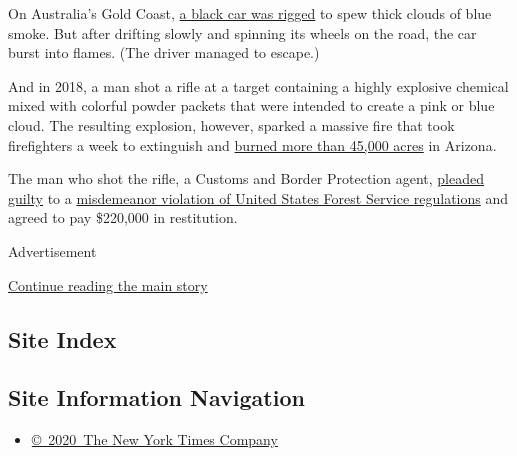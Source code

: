 On Australia's Gold Coast,
\href{https://www.cnn.com/videos/world/2019/07/09/australia-gold-coast-brisbane-gender-reveal-burnout-accident-lon-orig.cnn}{a
black car was rigged} to spew thick clouds of blue smoke. But after
drifting slowly and spinning its wheels on the road, the car burst into
flames. (The driver managed to escape.)

And in 2018, a man shot a rifle at a target containing a highly
explosive chemical mixed with colorful powder packets that were intended
to create a pink or blue cloud. The resulting explosion, however,
sparked a massive fire that took firefighters a week to extinguish and
\href{https://www.nytimes3xbfgragh.onion/2018/10/01/us/gender-reveal-arizona-fire.html}{burned
more than 45,000 acres} in Arizona.

The man who shot the rifle, a Customs and Border Protection agent,
\href{https://www.justice.gov/usao-az/pr/duty-border-patrol-agent-pleads-guilty-starting-2017-sawmill-fire-and-ordered-pay-more-8}{pleaded
guilty} to a
\href{https://www.nytimes3xbfgragh.onion/2018/10/01/us/gender-reveal-arizona-fire.html?module=inline}{misdemeanor
violation of United States Forest Service regulations} and agreed to pay
\$220,000 in restitution.

Advertisement

\protect\hyperlink{after-bottom}{Continue reading the main story}

\hypertarget{site-index}{%
\subsection{Site Index}\label{site-index}}

\hypertarget{site-information-navigation}{%
\subsection{Site Information
Navigation}\label{site-information-navigation}}

\begin{itemize}
\tightlist
\item
  \href{https://help.nytimes3xbfgragh.onion/hc/en-us/articles/115014792127-Copyright-notice}{©~2020~The
  New York Times Company}
\end{itemize}

